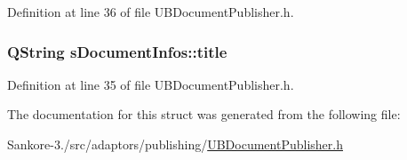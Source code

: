 Definition at line 36 of file U\-B\-Document\-Publisher.\-h.

\hypertarget{structs_document_infos_af5c9a5ab7a6a10f869ef7d9c06b472e7}{
\subsubsection[{title}]{\setlength{\rightskip}{0pt plus 5cm}Q\-String s\-Document\-Infos\-::title}}\label{d4/d55/structs_document_infos_af5c9a5ab7a6a10f869ef7d9c06b472e7}


Definition at line 35 of file U\-B\-Document\-Publisher.\-h.



The documentation for this struct was generated from the following file\-:\begin{DoxyCompactItemize}
\item 
Sankore-\/3./src/adaptors/publishing/\hyperlink{_u_b_document_publisher_8h}{U\-B\-Document\-Publisher.\-h}\end{DoxyCompactItemize}
